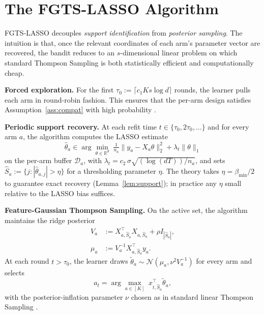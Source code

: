 \documentclass[journal,twoside,web]{ieeecolor}
\begin{document}
\section{The FGTS-LASSO Algorithm}\label{sec:algo}

FGTS-LASSO decouples \emph{support identification} from \emph{posterior sampling}. The intuition is that, once the relevant coordinates of each arm's parameter vector are recovered, the bandit reduces to an $s$-dimensional linear problem on which standard Thompson Sampling is both statistically efficient and computationally cheap.

\textbf{Forced exploration.} For the first $\tau_0 := \lceil c_1 K s \log d \rceil$ rounds, the learner pulls each arm in round-robin fashion. This ensures that the per-arm design satisfies Assumption~\ref{ass:compat} with high probability \cite{bastani2020online}.

\textbf{Periodic support recovery.} At each refit time $t \in \{\tau_0, 2\tau_0, \dots\}$ and for every arm $a$, the algorithm computes the LASSO estimate
\begin{equation}
\hat{\theta}_a \in \arg\min_{\theta \in \mathbb{R}^d}\; \tfrac{1}{n_a} \|y_a - X_a \theta\|_2^2 + \lambda_t \|\theta\|_1
\label{eq:lasso}
\end{equation}
on the per-arm buffer $\mathcal{D}_a$, with $\lambda_t = c_2\, \sigma \sqrt{(\log(dT))/n_a}$, and sets $\hat{S}_a := \{j : |\hat\theta_{a,j}| > \eta\}$ for a thresholding parameter $\eta$. The theory takes $\eta = \beta_{\min}/2$ to guarantee exact recovery (Lemma~\ref{lem:support}); in practice any $\eta$ small relative to the LASSO bias suffices.

\textbf{Feature-Gaussian Thompson Sampling.} On the active set, the algorithm maintains the ridge posterior
\begin{align}
V_a &:= X_{a,\hat{S}_a}^\top X_{a,\hat{S}_a} + \rho I_{|\hat{S}_a|}, \label{eq:posterior_cov}\\
\mu_a &:= V_a^{-1} X_{a,\hat{S}_a}^\top y_a. \label{eq:posterior_mean}
\end{align}
At each round $t > \tau_0$, the learner draws $\tilde{\theta}_a \sim \mathcal{N}(\mu_a, \nu^2 V_a^{-1})$ for every arm and selects
\begin{equation}
a_t = \arg\max_{a \in [K]}\; x_{t,\hat{S}_a}^\top \tilde{\theta}_a,
\label{eq:action}
\end{equation}
with the posterior-inflation parameter $\nu$ chosen as in standard linear Thompson Sampling \cite{agrawal2013thompson}.
\end{document}
